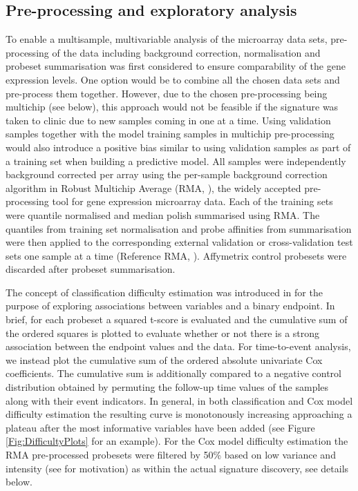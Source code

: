 \documentclass[letterpaper,12pt]{article}
\begin{document}
\subsection{Pre-processing and exploratory analysis}
To enable a multisample, multivariable analysis of the microarray data sets, pre-processing of the data including background correction, normalisation and probeset summarisation was first considered to ensure comparability of the gene expression levels. One option would be to combine all the chosen data sets and pre-process them together. However, due to the chosen pre-processing being multichip (see below), this approach would not be feasible if the signature was taken to clinic due to new samples coming in one at a time. Using validation samples together with the model training samples in multichip pre-processing would also introduce a positive bias similar to using validation samples as part of a training set when building a predictive model.
All samples were independently background corrected per array using the per-sample background correction algorithm in Robust Multichip Average (RMA, \citet{Bolstad:03}), the widely accepted pre-processing tool for gene expression microarray data. Each of the training sets were quantile normalised and median polish summarised using RMA. The quantiles from training set normalisation and probe affinities from summarisation were then applied to the corresponding external validation or cross-validation test sets one sample at a time (Reference RMA, \citet{Katz:06}). Affymetrix control probesets were discarded after probeset summarisation. 

The concept of classification difficulty estimation was introduced in \citet{Popovici:10} for the purpose of exploring associations between variables and a binary endpoint. In brief, for each probeset a squared t-score is evaluated and the cumulative sum of the ordered squares is plotted to evaluate whether or not there is a strong association between the endpoint values and the data. For time-to-event analysis, we instead plot the cumulative sum of the ordered absolute univariate Cox coefficients. The cumulative sum is additionally compared to a negative control distribution obtained by permuting the follow-up time values of the samples along with their event indicators. In general, in both classification and Cox model difficulty estimation the resulting curve is monotonously increasing approaching a plateau after the most informative variables have been added (see Figure \ref{Fig:DifficultyPlots} for an example). For the Cox model difficulty estimation the RMA pre-processed probesets were filtered by 50\% based on low variance and intensity (see \cite{Hackstadt:09} for motivation) as within the actual signature discovery, see details below.
\end{document}
